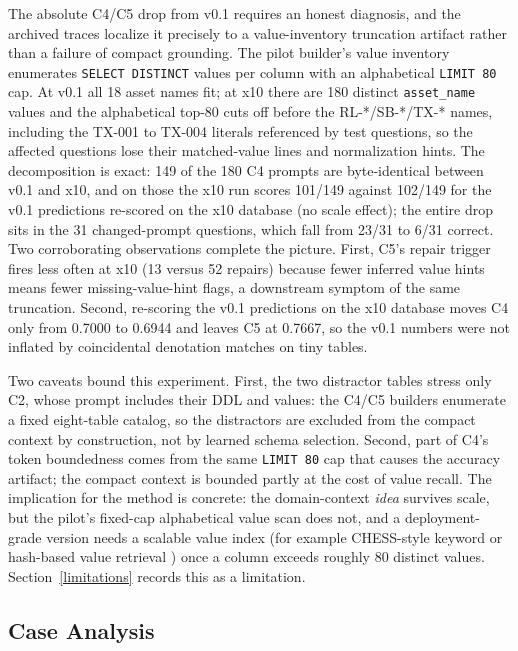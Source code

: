 \documentclass{ieeeaccess}
\begin{document}
The absolute C4/C5 drop from v0.1 requires an honest diagnosis, and the archived traces localize it precisely to a value-inventory truncation artifact rather than a failure of compact grounding. The pilot builder's value inventory enumerates \texttt{SELECT DISTINCT} values per column with an alphabetical \texttt{LIMIT 80} cap. At v0.1 all 18 asset names fit; at x10 there are 180 distinct \texttt{asset\_name} values and the alphabetical top-80 cuts off before the RL-*/SB-*/TX-* names, including the TX-001 to TX-004 literals referenced by test questions, so the affected questions lose their matched-value lines and normalization hints. The decomposition is exact: 149 of the 180 C4 prompts are byte-identical between v0.1 and x10, and on those the x10 run scores 101/149 against 102/149 for the v0.1 predictions re-scored on the x10 database (no scale effect); the entire drop sits in the 31 changed-prompt questions, which fall from 23/31 to 6/31 correct. Two corroborating observations complete the picture. First, C5's repair trigger fires less often at x10 (13 versus 52 repairs) because fewer inferred value hints means fewer missing-value-hint flags, a downstream symptom of the same truncation. Second, re-scoring the v0.1 predictions on the x10 database moves C4 only from 0.7000 to 0.6944 and leaves C5 at 0.7667, so the v0.1 numbers were not inflated by coincidental denotation matches on tiny tables.

Two caveats bound this experiment. First, the two distractor tables stress only C2, whose prompt includes their DDL and values: the C4/C5 builders enumerate a fixed eight-table catalog, so the distractors are excluded from the compact context by construction, not by learned schema selection. Second, part of C4's token boundedness comes from the same \texttt{LIMIT 80} cap that causes the accuracy artifact; the compact context is bounded partly at the cost of value recall. The implication for the method is concrete: the domain-context \emph{idea} survives scale, but the pilot's fixed-cap alphabetical value scan does not, and a deployment-grade version needs a scalable value index (for example CHESS-style keyword or hash-based value retrieval \cite{talaei2024chess}) once a column exceeds roughly 80 distinct values. Section~\ref{limitations} records this as a limitation.

\subsection{Case Analysis}\label{case-analysis}
\end{document}
